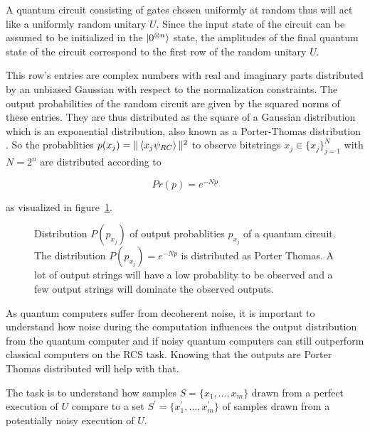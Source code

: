A quantum circuit consisting of gates chosen uniformly at random thus
will act like a uniformly random unitary $U$. Since the input state of the circuit can be assumed to be
initialized in the $\Ket{0^{\otimes n}}$ state, the amplitudes of the final
quantum state of the circuit correspond to the first row of the random unitary $U$.

This row's entries are complex numbers with real and imaginary parts
distributed by an unbiased Gaussian with respect to the normalization constraints.
The output probabilities of the random circuit are given by
the squared norms of these entries.
They are thus distributed as the square of
a Gaussian distribution which is an exponential distribution,
also known as a Porter-Thomas distribution \cite{Porter1956Fluctuations}. So the probablities $p(x_j) =
\| \Braket{x_j\psi_{RC}} \| ^2$ to observe bitstrings $x_j \in \{x_j\}_{j=1}^N$ with
$N=2^n$ are distributed according to

\begin{equation}
  Pr(p) = e^{-Np}
\end{equation}

as visualized in figure~\ref{fig:porterthomas}.

\begin{figure}[H]
  \label{fig:porterthomas}
  \centering
  \caption{Distribution $P(p_{x_j})$ of output probablities $p_{x_j}$ of a
    quantum circuit. The distribution $P(p_{x_j})=e^{-Np}$ is distributed as
    Porter Thomas. A lot of output strings will have a low probablity to be
    observed and a few output strings will dominate the observed outputs.}
\end{figure}

As quantum computers suffer from decoherent noise, it is
important to understand how noise during the computation influences the output
distribution from the quantum computer and if noisy quantum computers can still
outperform classical computers on the RCS task. Knowing that the outputs are
Porter Thomas distributed will help with that.

The task is to understand how samples $S=\{x_1,\dots,x_m\}$ drawn from a perfect execution of
$U$ compare to a set $S^{\prime}=\{x_1^{\prime},\dots,x_m^{\prime}\}$ of samples drawn from a potentially noisy
execution of $U$.

